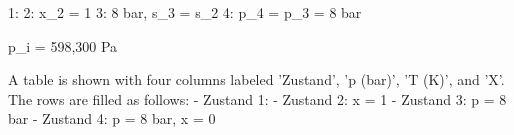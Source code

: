1: 
2: x_2 = 1
3: 8 bar, s_3 = s_2
4: p_4 = p_3 = 8 bar

p_i = 598,300 Pa

A table is shown with four columns labeled 'Zustand', 'p (bar)', 'T (K)', and 'X'. The rows are filled as follows:
- Zustand 1: 
- Zustand 2: x = 1
- Zustand 3: p = 8 bar
- Zustand 4: p = 8 bar, x = 0